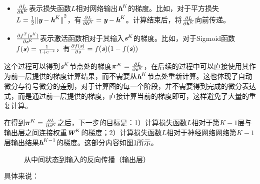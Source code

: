 \begin{spacing}{1.6}
\begin{itemize}
\vspace{0.5em}
\item $ \frac{\partial L}{\partial {\textbf{\em h}}^K} $表示损失函数$ L $相对网络输出$ {\textbf{\em h}}^K $的梯度。比如，对于平方损失$ L=\frac{1}{2}{\Vert {\textbf{\em y}}-{\textbf{\em h}}^K\Vert}^2 $，有$ \frac{\partial L}{\partial {\textbf{\em h}}^K}= {\textbf{\em y}} -{\textbf{\em h}}^K $。计算结束后，将$ \frac{\partial L}{\partial {\textbf{\em h}}^K} $向前传递。
\vspace{0.5em}
\item $ \frac{\partial f^T({\textbf{\em s}}^K)}{\partial {\textbf{\em s}}^K} $表示激活函数相对于其输入$ {\textbf{\em s}}^K $的梯度。比如，对于Sigmoid函数$ f({\textbf{\em s}})=\frac{1}{1+{\textrm e}^{- {\textbf{\em s}}}}$，有$ \frac{\partial f({\textbf{\em s}})}{\partial {\textbf{\em s}}}=f({\textbf{\em s}}) (1-f({\textbf{\em s}}))$
\vspace{0.5em}
\end{itemize}
\end{spacing}

\parinterval  这个过程可以得到$ {\textbf{\em s}}^K $节点处的梯度$ {\bm \pi}^K= \frac{\partial L}{\partial {\textbf{\em s}}^K} $，在后续的过程中可以直接使用其作为前一层提供的梯度计算结果，而不需要从$ {\textbf{\em h}}^K $节点处重新计算。这也体现了自动微分与符号微分的差别，对于计算图的每一个阶段，并不需要得到完成的微分表达式，而是通过前一层提供的梯度，直接计算当前的梯度即可，这样避免了大量的重复计算。

\parinterval  在得到$ {\bm \pi}^K= \frac{\partial L}{\partial {\textbf{\em s}}^K} $之后，下一步的目标是：1）计算损失函数$ L $相对于第$ K-1 $层与输出层之间连接权重$ {\textbf{\em W}}^K $的梯度；2）计算损失函数$ L $相对于神经网络网络第$ K-1 $层输出结果$ {\textbf{\em h}}^{K-1} $的梯度。这部分内容如图\ref{fig:9-55}所示。

\begin{figure}[htp]
\centering

\caption{从中间状态到输入的反向传播（输出层）}
\label{fig:9-55}
\end{figure}

\noindent  具体来说：

